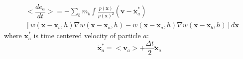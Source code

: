 \begin{equation}
\begin{split}
&<\dfrac{d e_{a}}{dt}> =-\sum_{b} m_{b} \int \frac{p(\textbf{x})}{\rho(\textbf{x})^2} (\textbf{v} - \dot{\textbf{x}}_{a}^{\ast})\\
&\left[ w(\textbf{x}- \textbf{x}_b, h) \nabla w(\textbf{x} - \textbf{x}_a, h) - w(\textbf{x} - \textbf{x}_a, h) \nabla w(\textbf{x} - \textbf{x}_b, h) \right] d\textbf{x} 
\end{split}
\label{eq:gov-gsph-e--approx}
\end{equation}
where $\dot{\textbf{x}}_{a}^{\ast}$ is time centered velocity of particle $a$:
\begin{equation}
\dot{\textbf{x}}_{a}^{\ast} = <\textbf{v}_{a}> + \frac{\Delta t}{2} \ddot{\textbf{x}}_{a}
\end{equation}

